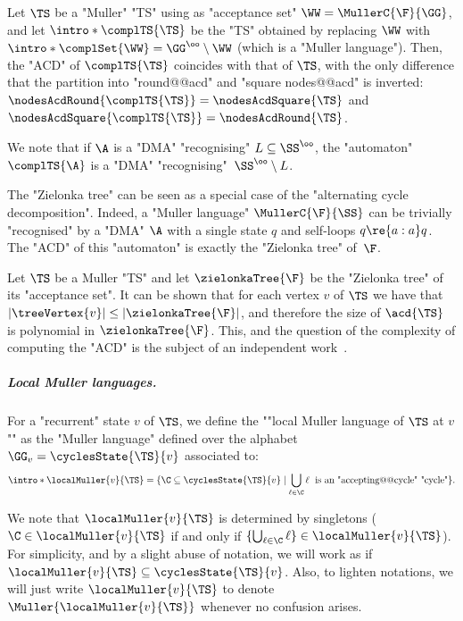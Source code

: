 \documentclass{theoretics}
\begin{document}
\begin{remark}\label{rmk-acd:complementation-ACD}
	Let $\TS$ be a "Muller" "TS" using as "acceptance set" $\WW = \MullerC{\F}{\GG}$, and let $\intro*\complTS{\TS}$ be the "TS" obtained by replacing $\WW$ with $\intro*\complSet{\WW} = \GG^\oo \setminus \WW$ (which is a "Muller language"). Then, the "ACD" of $\complTS{\TS}$ coincides with that of $\TS$, with the only difference that the partition into "round@@acd" and "square nodes@@acd" is inverted: $\nodesAcdRound{\complTS{\TS}} = \nodesAcdSquare{\TS}$ and $\nodesAcdSquare{\complTS{\TS}} = \nodesAcdRound{\TS}$.
	
	We note that if $\A$ is a "DMA" "recognising" $L\subseteq \SS^\oo$, the "automaton" $\complTS{\A}$ is a "DMA" "recognising"~$\SS^\oo\setminus L$.
\end{remark}

\begin{remark}\label{rmk-acd:ZT-as-ACD}
	The "Zielonka tree" can be seen as a special case of the "alternating cycle decomposition". Indeed, a "Muller language" $\MullerC{\F}{\SS}$ can be trivially "recognised" by a "DMA" $\A$ with a single state $q$ and self-loops $q\re{a:a}q$. The "ACD" of this "automaton" is exactly the "Zielonka tree" of~$\F$.
\end{remark}

\begin{remark}
    Let $\TS$ be a Muller "TS" and let $\zielonkaTree{\F}$ be the "Zielonka tree" of its "acceptance set". It can be shown that for each vertex $v$ of $\TS$ we have that $|\treeVertex{v}| \leq |\zielonkaTree{\F}|$, and therefore the size of $\acd{\TS}$ is polynomial in $\zielonkaTree{\F}$. 
    This, and the question of the complexity of computing the "ACD" is the subject of an independent work~\cite{CM24Simplifying}.
\end{remark}

\subparagraph{Local Muller languages.}\label{subsect-prelim:local-Muller}
\AP For a "recurrent" state $v$ of $\TS$, we define the ""local Muller language of $\TS$ at $v$"" as the "Muller language" defined over the alphabet $\GG_v = \cyclesState{\TS}{v}$ associated to:
\[ \intro*\localMuller{v}{\TS} = \{ \C \subseteq \cyclesState{\TS}{v} \mid \bigcup_{\ell\in \C} \ell \; \text{ is an "accepting@@cycle" "cycle"}\}. \] 

We note that $\localMuller{v}{\TS}$ is determined by singletons ($\C \in \localMuller{v}{\TS}$ if and only if $\{\bigcup_{\ell \in \C}\ell\} \in \localMuller{v}{\TS}$). For simplicity, and by a slight abuse of notation, we will work as if $\localMuller{v}{\TS} \subseteq \cyclesState{\TS}{v}$.
Also, to lighten notations, we will just write $\localMuller{v}{\TS}$ to denote $\Muller{\localMuller{v}{\TS}}$ whenever no confusion arises.
\end{document}
